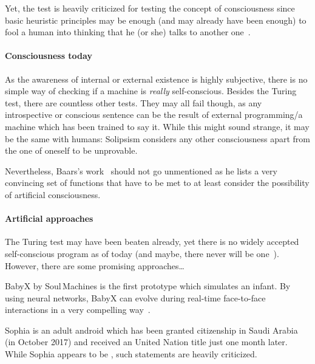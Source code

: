 Yet, the test is heavily criticized for testing the concept of consciousness since basic heuristic principles may be enough (and may already have been enough) to fool a human into thinking that he (or she) talks to another one~\cite{john1980minds}.

\paragraph{Consciousness today} As the awareness of internal or external existence is highly subjective, there is no simple way of checking if a machine is \emph{really} self-conscious. Besides the Turing test, there are countless other tests. They may all fail though, as any introspective or conscious sentence can be the result of external programming/a machine which has been trained to say it.
While this might sound strange, it may be the same with humans: Solipsism considers any other consciousness apart from the one of oneself to be unprovable.

Nevertheless, Baars's work~\cite{baars1993cognitive} should not go unmentioned as he lists a very convincing set of functions that have to be met to at least consider the possibility of artificial consciousness.


\paragraph{Artificial approaches}
The Turing test may have been beaten already, yet there is no widely accepted self-conscious program as of today (and maybe, there never will be one~\cite[p.~231]{Meissner2020}). However, there are some promising approaches\ldots

BabyX by Soul\,Machines is the first prototype which simulates an infant. By using neural networks, BabyX can evolve during real-time face-to-face interactions in a very compelling way~\cite{Sagar2015}.

Sophia is an adult android which has been granted citizenship in Saudi Arabia (in October 2017) and received an United Nation title just one month later. While Sophia appears to be , such statements are heavily criticized.

